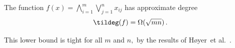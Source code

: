 \begin{theorem}
The function $f(x)=\bigwedge_{i=1}^m\bigvee_{j=1}^nx_{ij}$ has
approximate degree
\begin{align*}
\tildeg(f)=\Omega(\sqrt{mn})\,.
\end{align*}
%
\end{theorem}

This lower bound is tight for all $m$ and $n,$
by the results of H\o yer~et al.~\cite{hoyer-mosca-dewolf03and-or-tree}. 
